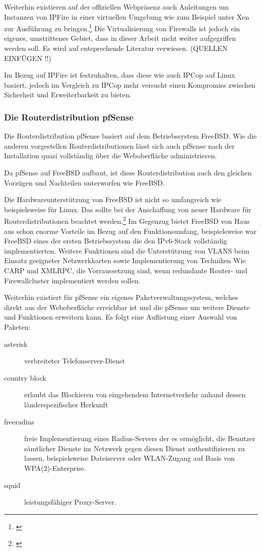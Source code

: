 \documentclass[a4paper,12pt]{scrartcl}
\begin{document}
Weiterhin existieren auf der offiziellen Webpr\"asenz auch Anleitungen um
Instanzen von IPFire in einer virtuellen Umgebung wie zum Beispiel unter Xen
zur Ausf\"uhrung zu bringen.\footnote{\cite{IPFireAddons}} Die Virtualisierung
von Firewalls ist jedoch ein eigenes, umstrittenes Gebiet, dass in dieser
Arbeit nicht weiter aufgegriffen werden soll. Es wird auf entsprechende
Literatur verwiesen. (QUELLEN EINF\"UGEN !!)

Im Bezug auf IPFire ist festzuhalten, dass diese wie auch IPCop auf Linux
basiert, jedoch im Vergleich zu IPCop mehr versucht einen Kompromiss zwischen
Sicherheit und Erweiterbarkeit zu bieten.

\subsubsection{Die Routerdistribution pfSense}
Die Routerdistribution pfSense basiert auf dem Betriebssystem FreeBSD. Wie die
anderen vorgestellen Routerdistributionen l\"asst sich auch pfSense nach der
Installation quasi vollst\"andig \"uber die Weboberfl\"ache administrieren.

Da pfSense auf FreeBSD aufbaut, ist diese Routerdistribution auch den gleichen
Vorz\"ugen und Nachteilen unterworfen wie FreeBSD.

Die Hardwareunterst\"utzung von FreeBSD ist nicht so umfangreich wie
beispielsweise f\"ur Linux. Das sollte bei der Anschaffung von neuer Hardware
f\"ur Routerdistributionen beachtet werden.\footnote{\cite{FreeBSDHardware}} Im
Gegenzug bietet FreeBSD von Haus aus schon enorme Vorteile im Bezug auf den
Funktionsumfang, beispielsweise war FreeBSD eines der ersten Betriebssystem die
den IPv6-Stack vollst\"andig implementierten. Weitere Funktionen sind die
Unterst\"utzung von VLANS beim Einsatz geeigneter Netzwerkkarten sowie
Implementierung von Techniken Wie CARP und XMLRPC, die Vorraussetzung sind,
wenn redundante Router- und Firewallcluster implementiert werden sollen.

Weiterhin existiert f\"ur pfSense ein eigenes Paketverwaltungssystem, welches
direkt aus der Weboberfl\"ache erreichbar ist und die pfSense um weitere
Dienste und Funktionen erweitern kann. Es folgt eine Auflistung einer Auswahl
von Paketen:
\begin{description}
 \item[asterisk] verbreiteter Telefonserver-Dienst
 \item[country block] erlaubt das Blockieren von eingehendem Internetverkehr
anhand dessen l\"anderspezifischer Herkunft
 \item[freeradius] freie Implementierung eines Radius-Servers der es
erm\"oglicht, die Benutzer s\"amtlicher Dienste im Netzwerk gegen diesen Dienst
authentifizieren zu lassen, beispielsweise Dateiserver oder WLAN-Zugang auf
Basis von WPA(2)-Enterprise.
 \item[squid] leistungsf\"ahiger Proxy-Server.
\end{description}
\end{document}
